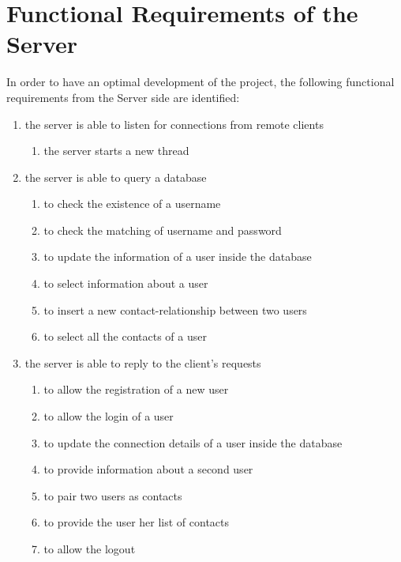 \documentclass[finalReport.tex]{subfiles}
\begin{document}
\section{Functional Requirements of the Server}\label{sec:FRserver} 
In order to have an optimal development of the project, the following functional requirements from the Server side are identified:
\begin{enumerate}[label=(\Alph*)]

\item the server is able to listen for connections from remote clients
\begin{enumerate}[label=(\Alph*)]
\item the server starts a new thread 
\end{enumerate}

\item the server is able to query a database
\begin{enumerate}[label=(\Alph*)]
\item to check the existence of a username
\item to check the matching of username and password
\item to update the information of a user inside the database
\item to select information about a user
\item to insert a new contact-relationship between two users
\item to select all the contacts of a user
\end{enumerate} 

\item the server is able to reply to the client's requests
\begin{enumerate}[label=(\Alph*)]
\item to allow the registration of a new user
\item to allow the login of a user
\item to update the connection details of a user inside the database
\item to provide information about a second user
\item to pair two users as contacts
\item to provide the user her list of contacts
\item to allow the logout 
\end{enumerate}


\end{enumerate}
\end{document}
